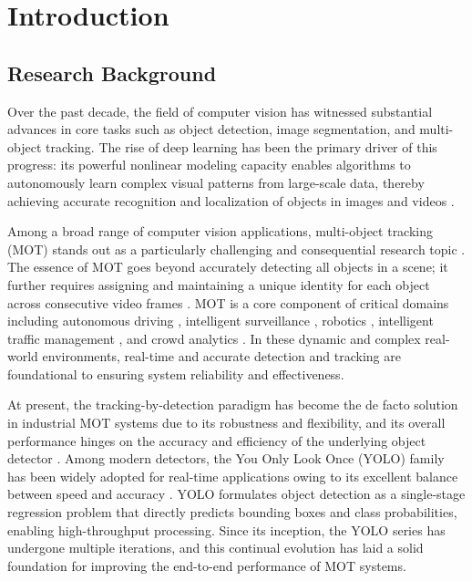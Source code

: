 \clearpage
\section{Introduction}\label{section::introduction}

\subsection{Research Background}
Over the past decade, the field of computer vision has witnessed substantial advances in core tasks such as object detection, image segmentation, and multi-object tracking. The rise of deep learning has been the primary driver of this progress: its powerful nonlinear modeling capacity enables algorithms to autonomously learn complex visual patterns from large-scale data, thereby achieving accurate recognition and localization of objects in images and videos \cite{113,28_kaur_comprehensive_2023}.

Among a broad range of computer vision applications, multi-object tracking (MOT) stands out as a particularly challenging and consequential research topic \cite{104}. The essence of MOT goes beyond accurately detecting all objects in a scene; it further requires assigning and maintaining a unique identity for each object across consecutive video frames \cite{103}. MOT is a core component of critical domains including autonomous driving \cite{117}, intelligent surveillance \cite{59_wang_deep_2024}, robotics \cite{188}, intelligent traffic management \cite{144}, and crowd analytics \cite{158}. In these dynamic and complex real-world environments, real-time and accurate detection and tracking are foundational to ensuring system reliability and effectiveness.

At present, the tracking-by-detection paradigm has become the de facto solution in industrial MOT systems due to its robustness and flexibility, and its overall performance hinges on the accuracy and efficiency of the underlying object detector \cite{132}. Among modern detectors, the You Only Look Once (YOLO) family has been widely adopted for real-time applications owing to its excellent balance between speed and accuracy \cite{02_noauthor_review_nodate,141}. YOLO formulates object detection as a single-stage regression problem that directly predicts bounding boxes and class probabilities, enabling high-throughput processing. Since its inception, the YOLO series has undergone multiple iterations, and this continual evolution has laid a solid foundation for improving the end-to-end performance of MOT systems.

